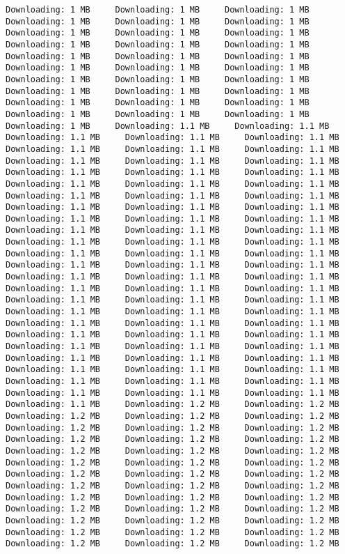 \documentclass[gc, manuscript]{copernicus}
\begin{document}
\begin{verbatim}
Downloading: 1 MB     Downloading: 1 MB     Downloading: 1 MB     Downloading: 1 MB     Downloading: 1 MB     Downloading: 1 MB     Downloading: 1 MB     Downloading: 1 MB     Downloading: 1 MB     Downloading: 1 MB     Downloading: 1 MB     Downloading: 1 MB     Downloading: 1 MB     Downloading: 1 MB     Downloading: 1 MB     Downloading: 1 MB     Downloading: 1 MB     Downloading: 1 MB     Downloading: 1 MB     Downloading: 1 MB     Downloading: 1 MB     Downloading: 1 MB     Downloading: 1 MB     Downloading: 1 MB     Downloading: 1 MB     Downloading: 1 MB     Downloading: 1 MB     Downloading: 1 MB     Downloading: 1 MB     Downloading: 1 MB     Downloading: 1 MB     Downloading: 1.1 MB     Downloading: 1.1 MB     Downloading: 1.1 MB     Downloading: 1.1 MB     Downloading: 1.1 MB     Downloading: 1.1 MB     Downloading: 1.1 MB     Downloading: 1.1 MB     Downloading: 1.1 MB     Downloading: 1.1 MB     Downloading: 1.1 MB     Downloading: 1.1 MB     Downloading: 1.1 MB     Downloading: 1.1 MB     Downloading: 1.1 MB     Downloading: 1.1 MB     Downloading: 1.1 MB     Downloading: 1.1 MB     Downloading: 1.1 MB     Downloading: 1.1 MB     Downloading: 1.1 MB     Downloading: 1.1 MB     Downloading: 1.1 MB     Downloading: 1.1 MB     Downloading: 1.1 MB     Downloading: 1.1 MB     Downloading: 1.1 MB     Downloading: 1.1 MB     Downloading: 1.1 MB     Downloading: 1.1 MB     Downloading: 1.1 MB     Downloading: 1.1 MB     Downloading: 1.1 MB     Downloading: 1.1 MB     Downloading: 1.1 MB     Downloading: 1.1 MB     Downloading: 1.1 MB     Downloading: 1.1 MB     Downloading: 1.1 MB     Downloading: 1.1 MB     Downloading: 1.1 MB     Downloading: 1.1 MB     Downloading: 1.1 MB     Downloading: 1.1 MB     Downloading: 1.1 MB     Downloading: 1.1 MB     Downloading: 1.1 MB     Downloading: 1.1 MB     Downloading: 1.1 MB     Downloading: 1.1 MB     Downloading: 1.1 MB     Downloading: 1.1 MB     Downloading: 1.1 MB     Downloading: 1.1 MB     Downloading: 1.1 MB     Downloading: 1.1 MB     Downloading: 1.1 MB     Downloading: 1.1 MB     Downloading: 1.1 MB     Downloading: 1.1 MB     Downloading: 1.1 MB     Downloading: 1.1 MB     Downloading: 1.1 MB     Downloading: 1.1 MB     Downloading: 1.1 MB     Downloading: 1.1 MB     Downloading: 1.1 MB     Downloading: 1.1 MB     Downloading: 1.1 MB     Downloading: 1.1 MB     Downloading: 1.1 MB     Downloading: 1.1 MB     Downloading: 1.2 MB     Downloading: 1.2 MB     Downloading: 1.2 MB     Downloading: 1.2 MB     Downloading: 1.2 MB     Downloading: 1.2 MB     Downloading: 1.2 MB     Downloading: 1.2 MB     Downloading: 1.2 MB     Downloading: 1.2 MB     Downloading: 1.2 MB     Downloading: 1.2 MB     Downloading: 1.2 MB     Downloading: 1.2 MB     Downloading: 1.2 MB     Downloading: 1.2 MB     Downloading: 1.2 MB     Downloading: 1.2 MB     Downloading: 1.2 MB     Downloading: 1.2 MB     Downloading: 1.2 MB     Downloading: 1.2 MB     Downloading: 1.2 MB     Downloading: 1.2 MB     Downloading: 1.2 MB     Downloading: 1.2 MB     Downloading: 1.2 MB     Downloading: 1.2 MB     Downloading: 1.2 MB     Downloading: 1.2 MB     Downloading: 1.2 MB     Downloading: 1.2 MB     Downloading: 1.2 MB     Downloading: 1.2 MB     Downloading: 1.2 MB     Downloading: 1.2 MB     Downloading: 1.2 MB     Downloading: 1.2 MB  
\end{verbatim}
\end{document}

